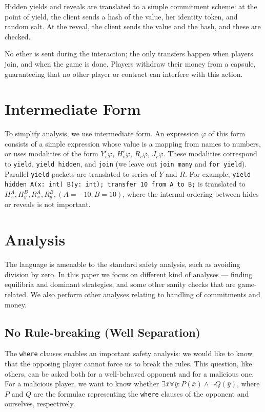 \documentclass[acmsmall,review,anonymous]{acmart}\settopmatter{printfolios=true,printccs=false,printacmref=false}
\begin{document}
Hidden yields and reveals are translated to a simple commitment scheme: at the point of yield, the client sends a hash of the value, her identity token, and random salt. At the reveal, the client sends the value and the hash, and these are checked.

No ether is sent during the interaction; the only transfers happen when players join, and when the game is done. Players withdraw their money from a capsule, guaranteeing that no other player or contract can interfere with this action.

\section{Intermediate Form}
To simplify analysis, we use intermediate form. An expression $\varphi$ of this form consists of a simple expression whose value is a mapping from names to numbers, or uses modalities of the form $Y^r_v\varphi$, $H^r_v\varphi$, $R_v\varphi$, $J_r\varphi$. These modalities correspond to \texttt{yield}, \texttt{yield hidden}, and \texttt{join} (we leave out \texttt{join many} and \texttt{for yield}). Parallel \texttt{yield} packets are translated to series of $Y$ and $R$. For example, \texttt{yield hidden A(x: int) B(y: int); transfer 10 from A to B;} is translated to $H^A_x, H^B_y, R^A_x, R^B_y, (A=-10; B=10)$, where the internal ordering between hides or reveals is not important.

\section{Analysis}
The language is amenable to the standard safety analysis, such as avoiding division by zero. In this paper we focus on different kind of analyses --- finding equilibria and dominant strategies, and some other sanity checks that are game-related. We also perform other analyses relating to handling of commitments and money.

\subsection{No Rule-breaking (Well Separation)}
The \texttt{where} clauses enables an important safety analysis: we would like to know that the opposing player cannot force us to break the rules. This question, like others, can be asked both for a well-behaved opponent and for a malicious one. For a malicious player, we want to know whether $\exists \overline{x} \forall \overline{y}: P(\overline{x})\wedge \neg Q(\overline{y})$, where $P$ and $Q$ are the formulae representing the \texttt{where} clauses of the opponent and ourselves, respectively.
\end{document}
